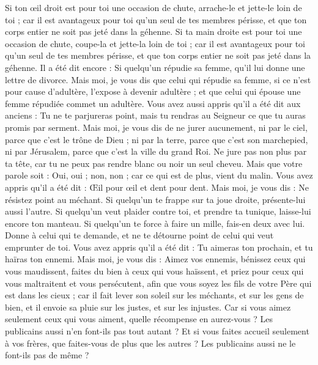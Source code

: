 \begin{multicols}{2}
Si ton œil droit est pour toi une occasion de chute, arrache-le et jette-le loin de toi ; car il est avantageux pour toi qu'un seul de tes membres périsse, et que ton corps entier ne soit pas jeté dans la géhenne.
Si ta main droite est pour toi une occasion de chute, coupe-la et jette-la loin de toi ; car il est avantageux pour toi qu’un seul de tes membres périsse, et que ton corps entier ne soit pas jeté dans la géhenne.
Il a été dit encore : Si quelqu'un répudie sa femme, qu'il lui donne une lettre de divorce.
Mais moi, je vous dis que celui qui répudie sa femme, si ce n'est pour cause d'adultère, l’expose à devenir adultère ; et que celui qui épouse une femme répudiée commet un adultère.
Vous avez aussi appris qu'il a été dit aux anciens : Tu ne te parjureras point, mais tu rendras au Seigneur ce que tu auras promis par serment.
Mais moi, je vous dis de ne jurer aucunement, ni par le ciel, parce que c'est le trône de Dieu ;
ni par la terre, parce que c'est son marchepied, ni par Jérusalem, parce que c'est la ville du grand Roi.
Ne jure pas non plus par ta tête, car tu ne peux pas rendre blanc ou noir un seul cheveu.
Mais que votre parole soit : Oui, oui ; non, non ; car ce qui est de plus, vient du malin.
Vous avez appris qu'il a été dit : Œil pour œil et dent pour dent.
Mais moi, je vous dis : Ne résistez point au méchant. Si quelqu'un te frappe sur ta joue droite, présente-lui aussi l'autre.
Si quelqu'un veut plaider contre toi, et prendre ta tunique, laisse-lui encore ton manteau.
Si quelqu'un te force à faire un mille, fais-en deux avec lui.
Donne à celui qui te demande, et ne te détourne point de celui qui veut emprunter de toi.
Vous avez appris qu'il a été dit : Tu aimeras ton prochain, et tu haïras ton ennemi.
Mais moi, je vous dis : Aimez vos ennemis, bénissez ceux qui vous maudissent, faites du bien à ceux qui vous haïssent, et priez pour ceux qui vous maltraitent et vous persécutent,
afin que vous soyez les fils de votre Père qui est dans les cieux ; car il fait lever son soleil sur les méchants, et sur les gens de bien, et il envoie sa pluie sur les justes, et sur les injustes.
Car si vous aimez seulement ceux qui vous aiment, quelle récompense en aurez-vous ? Les publicains aussi n'en font-ils pas tout autant ?
Et si vous faites accueil seulement à vos frères, que faites-vous de plus que les autres ? Les publicains aussi ne le font-ils pas de même ?

\end{multicols}
